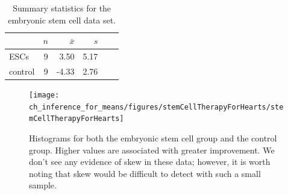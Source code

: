 \textA{\newpage}


\begin{table}[h]
\centering
\begin{tabular}{l rrrrr}
\hline
\hspace{10mm}	& $n$	& $\bar{x}$	& $s$  	 \\
\hline
ESCs		& 9		& 3.50		& 5.17  	\\
control		& 9		& -4.33		& 2.76  	 \\
\hline
\end{tabular}
\caption{Summary statistics for the embryonic stem cell data set.}
\label{summaryStatsForSheepHeartDataWhoReceivedMiceESCs}
\end{table}

\begin{figure}
\centering
\texttt{[image: ch\_inference\_for\_means/figures/stemCellTherapyForHearts/stemCellTherapyForHearts]}
\caption{Histograms for both the embryonic stem cell group and the control group. Higher values are associated with greater improvement. We don't see any evidence of skew in these data; however, it is worth noting that skew would be difficult to detect with such a small sample.}
\label{stemCellTherapyForHearts}
\end{figure}

